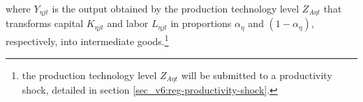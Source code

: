 \documentclass[../thesis.tex]{subfiles}
\begin{document}
where $Y_{\eta jt}$ is the output obtained by the production technology level $Z_{A\eta t}$ that transforms capital $K_{\eta jt}$ and labor $L_{\eta jt}$ in proportions ${\alpha_{\eta}}$ and $(1-{\alpha_{\eta}})$, respectively, into intermediate goods.\footnote{the production technology level $Z_{A\eta t}$ will be submitted to a productivity shock, detailed in section \ref{sec_v6:reg-productivity-shock}.}

\begin{comment}
	
\subsubsection*{Lagrangian}

Transform the minimization problem with restriction into one without restriction applying the Lagrangian function $\mathcal{L}$:
\begin{align}
	\label{eq_v2:reg-int-good-firm-lagrangian}
	\mathcal{L} = (R_{t} K_{\eta jt} + W_t L_{\eta jt}) - \Lambda_{\eta jt} (Z_{A\eta t} K_{\eta jt}^{\alpha_{\eta}} L_{\eta jt}^{1-{\alpha_{\eta}}} - Y_{\eta jt})
\end{align}

where the Lagrangian multiplier $\Lambda_{\eta jt}$ is the marginal cost.\footnote{see Lemma \ref{lemma:marginal-cost}}

\subsubsection*{First Order Condition}

The first-order conditions are:
\begin{alignat}{2}
	K_{\eta jt}: \quad & R_{t} - \Lambda_{\eta jt} Z_{A\eta t} {\alpha_{\eta}} K_{\eta jt}^{{\alpha_{\eta}}-1} L_{\eta jt}^{1-{\alpha_{\eta}}} = 0 &&\implies \nonumber \\
	& K_{\eta jt} = {\alpha_{\eta}} Y_{\eta jt} \frac{\Lambda_{\eta jt}}{R_{t}} \label{eq_v2:reg-int-good-firm-FOC-Kt} \\
	L_{\eta jt}: \quad & W_t - \Lambda_{\eta jt} Z_{A\eta t} K_{\eta jt}^{\alpha_{\eta}} (1-{\alpha_{\eta}}) L_{\eta jt}^{-{\alpha_{\eta}}} = 0 \quad &&\implies \nonumber \\ 
	& L_{\eta jt} = (1-{\alpha_{\eta}}) Y_{\eta jt} \frac{\Lambda_{\eta jt}}{W_t} \label{eq_v2:reg-int-good-firm-FOC-Lt-0} \\
	\Lambda_{\eta jt}: \quad & Y_{\eta jt} = Z_{A\eta t} K_{\eta jt}^{\alpha_{\eta}} L_{\eta jt}^{1-{\alpha_{\eta}}} \tag{\ref{eq_v2:reg-int-good-firm-prod-function}}
\end{alignat}

\end{comment}
\end{document}
